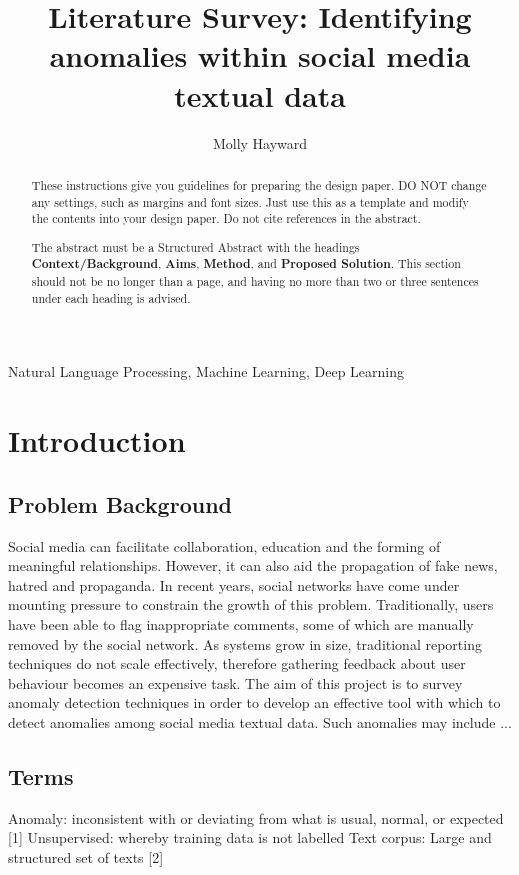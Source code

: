 \documentclass[12pt,a4paper]{article}
\title{Literature Survey: Identifying anomalies within social media textual data}
\author{Molly Hayward}
\date{}
\begin{document}
\maketitle

\begin{abstract}
These instructions give you guidelines for preparing the design paper.  DO NOT change any settings, such as margins and font sizes.  Just use this as a template and modify the contents into your design paper.  Do not cite references in the abstract.

The abstract must be a Structured Abstract with the headings {\bf Context/Background}, {\bf Aims}, {\bf Method}, and {\bf Proposed Solution}.  This section should not be no longer than a page, and having no more than two or three sentences under each heading is advised.
\end{abstract}

\begin{keywords}
Natural Language Processing, Machine Learning, Deep Learning
\end{keywords}

\section{Introduction}

\subsection{Problem Background}
Social media can facilitate collaboration, education and the forming of meaningful relationships. However, it can also aid the propagation of fake news, hatred and propaganda. In recent years, social networks have come under mounting pressure to constrain the growth of this problem. Traditionally, users have been able to flag inappropriate comments, some of which are manually removed by the social network. As systems grow in size, traditional reporting techniques do not scale effectively, therefore gathering feedback about user behaviour becomes an expensive task.
The aim of this project is to survey anomaly detection techniques in order to develop an effective tool with which to detect anomalies among social media textual data. Such anomalies may include ...


\subsection{Terms}
Anomaly: inconsistent with or deviating from what is usual, normal, or expected [1]\newline
Unsupervised: whereby training data is not labelled\newline
Text corpus: Large and structured set of texts [2]\newline
\end{document}

